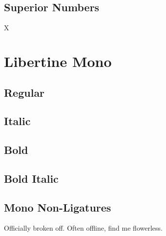\documentclass{article}
\begin{document}

\subsection*{Superior Numbers}

X

\clearpage
\section{Libertine Mono}\tt

\subsection*{Regular}
\lipsum[1]

\subsection*{Italic}
\textit{\lipsum[1]}

\subsection*{Bold}
\textbf{\lipsum[1]}

\subsection*{Bold Italic}

\textbf{\textit{\lipsum[1]}}


\subsection*{Mono Non-Ligatures}

Officially broken off. Often offline, find me flowerless.


\clearpage
\end{document}
